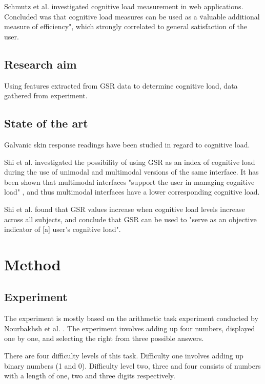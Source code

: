 \documentclass[12pt,leqno,letterpaper]{report} %
\begin{document}
Schmutz et al. \citep{Schmutz2009} investigated cognitive load measurement in web applications. Concluded was that cognitive load measures can be used as a \"valuable additional measure of efficiency", which strongly correlated to general satisfaction of the user. 



\section{Research aim}
Using features extracted from GSR data to determine cognitive load, data gathered from experiment.

\section{State of the art}
Galvanic skin response readings have been studied in regard to cognitive load.

Shi et al. \citep{Shi2007} investigated the possibility of using GSR as an index of cognitive load during the use of unimodal and multimodal versions of the same interface. It has been shown that multimodal interfaces "support the user in managing cognitive load" \citep{Oviatt2004}, and thus multimodal interfaces have a lower corresponding cognitive load. 

Shi et al. found that GSR values increase when cognitive load levels increase across all subjects, and conclude that GSR can be used to "serve as an objective indicator of [a] user's cognitive load".





\chapter{Method}

\section{Experiment}
The experiment is mostly based on the arithmetic task experiment conducted by Nourbakhsh et al. \citep{Nourbakhsh2012}. The experiment involves adding up four numbers, displayed one by one, and selecting the right from three possible answers.

There are four difficulty levels of this task. Difficulty one involves adding up binary numbers (1 and 0). Difficulty level two, three and four consists of numbers with a length of one, two and three digits respectively.
\end{document}
